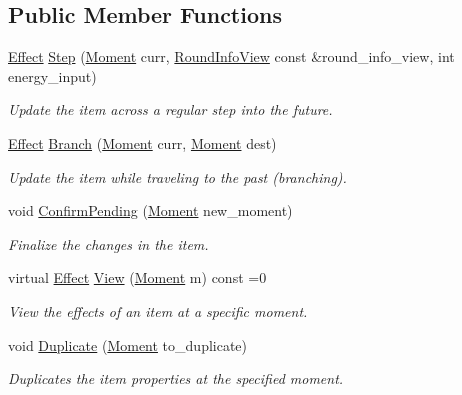 \subsection*{Public Member Functions}
\begin{DoxyCompactItemize}
\item 
\hyperlink{classitem_1_1_effect}{Effect} \hyperlink{classitem_1_1_item_ad8d77979820782fd86a0a67e2ea25c75}{Step} (\hyperlink{classtimeplane_1_1_moment}{Moment} curr, \hyperlink{classroundinfo_1_1_round_info_view}{Round\+Info\+View} const \&round\+\_\+info\+\_\+view, int energy\+\_\+input)
\begin{DoxyCompactList}\small\item\em Update the item across a regular step into the future. \end{DoxyCompactList}\item 
\hyperlink{classitem_1_1_effect}{Effect} \hyperlink{classitem_1_1_item_aa4b1c982b6d35d047c7a8ea86b06be99}{Branch} (\hyperlink{classtimeplane_1_1_moment}{Moment} curr, \hyperlink{classtimeplane_1_1_moment}{Moment} dest)
\begin{DoxyCompactList}\small\item\em Update the item while traveling to the past (branching). \end{DoxyCompactList}\item 
void \hyperlink{classitem_1_1_item_a99eaccdd31a817a7cb0e501cb632f711}{Confirm\+Pending} (\hyperlink{classtimeplane_1_1_moment}{Moment} new\+\_\+moment)
\begin{DoxyCompactList}\small\item\em Finalize the changes in the item. \end{DoxyCompactList}\item 
virtual \hyperlink{classitem_1_1_effect}{Effect} \hyperlink{classitem_1_1_item_a7d2b010a27fec55e04a56e7c4fca7837}{View} (\hyperlink{classtimeplane_1_1_moment}{Moment} m) const =0
\begin{DoxyCompactList}\small\item\em View the effects of an item at a specific moment. \end{DoxyCompactList}\item 
void \hyperlink{classitem_1_1_item_ab31c1b5e2b0993341e7a268693960b90}{Duplicate} (\hyperlink{classtimeplane_1_1_moment}{Moment} to\+\_\+duplicate)
\begin{DoxyCompactList}\small\item\em Duplicates the item properties at the specified moment. \end{DoxyCompactList}\item 

\end{DoxyCompactItemize}
